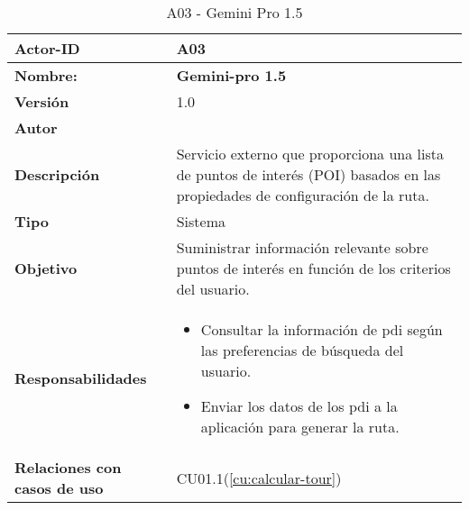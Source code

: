 \begin{table}[H]
	\centering

	\begin{tabularx}{\linewidth}{ p{} p{} }
		\toprule
		\textbf{Actor-ID}    & A03 \\
		\toprule
		\textbf{Nombre: } 			  & \textbf{Gemini-pro 1.5} \\
		\textbf{Versión}              & 1.0    \\
		\textbf{Autor}                & \autor \\
		\textbf{Descripción}          & Servicio externo que proporciona una lista de puntos de interés (POI) basados en las propiedades de configuración de la ruta. \\
		\textbf{Tipo}                 & Sistema \\
		\textbf{Objetivo}             & Suministrar información relevante sobre puntos de interés en función de los criterios del usuario. \\
		\textbf{Responsabilidades}    & 
		\begin{itemize}
			\tightlist
			\item Consultar la información de \acrshort{pdi} según las preferencias de búsqueda del usuario.
			\item Enviar los datos de los \acrfull{pdi} a la aplicación para generar la ruta.
		\end{itemize}\\
		\textbf{Relaciones con casos de uso} & CU01.1(\ref{cu:calcular-tour})\\
		\bottomrule
	\end{tabularx}
	\caption{A03 - Gemini Pro 1.5}
	\label{actor:gemini}
\end{table}

